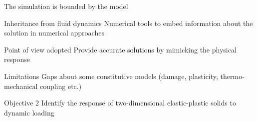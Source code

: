 \begin{withoutheadline}
  \begin{frame}{The simulation is bounded by the model}
    \begin{block}{Inheritance from fluid dynamics}
      Numerical tools to embed information about the solution in numerical approaches
    \end{block}\pause
    \begin{block}{Point of view adopted}%
      Provide accurate solutions by mimicking the physical response
    \end{block}\pause
    \begin{block}{Limitations}
      Gaps about some constitutive models (damage, plasticity, thermo-mechanical coupling etc.)
    \end{block}\pause
    \begin{block}{Objective 2}
      Identify the response of two-dimensional elastic-plastic solids to dynamic loading
    \end{block}
  \end{frame}
\end{withoutheadline}




